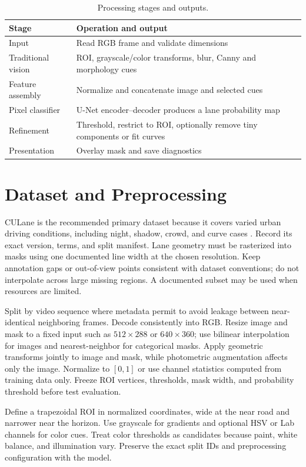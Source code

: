 \documentclass[10pt,a4paper,twocolumn]{article}
\begin{document}
\begin{table}[H]
\centering
\caption{Processing stages and outputs.}
\footnotesize
\begin{tabularx}{\columnwidth}{|l|X|}
\hline
\rowcolor{gray!18}\textbf{Stage}&\textbf{Operation and output}\\ \hline
Input & Read RGB frame and validate dimensions\\ \hline
Traditional vision & ROI, grayscale/color transforms, blur, Canny and morphology cues\\ \hline
Feature assembly & Normalize and concatenate image and selected cues\\ \hline
Pixel classifier & U-Net encoder--decoder produces a lane probability map\\ \hline
Refinement & Threshold, restrict to ROI, optionally remove tiny components or fit curves\\ \hline
Presentation & Overlay mask and save diagnostics\\ \hline
\end{tabularx}
\end{table}

\section{Dataset and Preprocessing}\label{sec:data}
CULane is the recommended primary dataset because it covers varied urban driving conditions, including night, shadow, crowd, and curve cases \cite{pan2018}. Record its exact version, terms, and split manifest. Lane geometry must be rasterized into masks using one documented line width at the chosen resolution. Keep annotation gaps or out-of-view points consistent with dataset conventions; do not interpolate across large missing regions. A documented subset may be used when resources are limited.

Split by video sequence where metadata permit to avoid leakage between near-identical neighboring frames. Decode consistently into RGB. Resize image and mask to a fixed input such as $512\times288$ or $640\times360$; use bilinear interpolation for images and nearest-neighbor for categorical masks. Apply geometric transforms jointly to image and mask, while photometric augmentation affects only the image. Normalize to $[0,1]$ or use channel statistics computed from training data only. Freeze ROI vertices, thresholds, mask width, and probability threshold before test evaluation.

Define a trapezoidal ROI in normalized coordinates, wide at the near road and narrower near the horizon. Use grayscale for gradients and optional HSV or Lab channels for color cues. Treat color thresholds as candidates because paint, white balance, and illumination vary. Preserve the exact split IDs and preprocessing configuration with the model.
\end{document}
